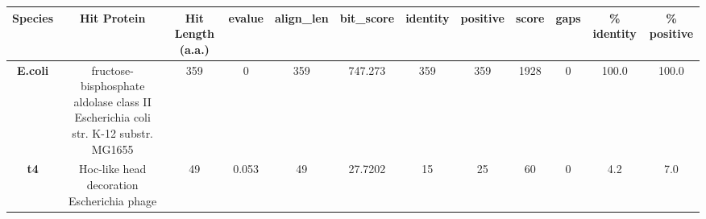 \begin{tabular}{|c|c|c|c|c|c|c|c|c|c|c|c|} \hline
\textbf{Species} & \textbf{Hit Protein} & \textbf{Hit Length (a.a.)} & \textbf{evalue} & \textbf{align\_len} & \textbf{bit\_score} & \textbf{identity} & \textbf{positive} & \textbf{score} & \textbf{gaps} & \textbf{\% identity} & \textbf{\% positive} \\ \hline
\textbf{E.coli} & fructose-bisphosphate aldolase class II Escherichia coli str. K-12 substr. MG1655 & 359 & 0 & 359 & 747.273 & 359 & 359 & 1928 & 0 & 100.0 & 100.0\\
\textbf{t4} & Hoc-like head decoration Escherichia phage  & 49 & 0.053 & 49 & 27.7202 & 15 & 25 & 60 & 0 & 4.2 & 7.0\\
\hline \end{tabular}
